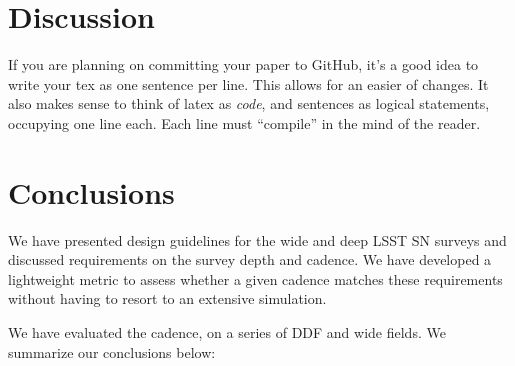\documentclass[\docopts]{\docclass}
\begin{document}






\section{Discussion}
\label{sec:discussion}

If you are planning on committing your paper to GitHub, it's a good idea to write your tex as one sentence per line.
This allows for an easier  of changes.
It also makes sense to think of latex as \emph{code}, and sentences as logical statements, occupying one line each.
Each line must ``compile'' in the mind of the reader.



\section{Conclusions}
\label{sec:conclusions}

We have presented design guidelines for the wide and deep LSST SN
surveys and discussed requirements on the survey depth and cadence.
We have developed a lightweight metric to assess whether a given
cadence matches these requirements without having to resort to an
extensive simulation.

We have evaluated the  cadence, on a series of DDF
and wide fields. We summarize our conclusions below:
\end{document}
